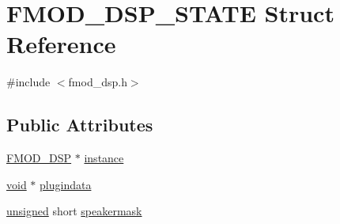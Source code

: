 \hypertarget{struct_f_m_o_d___d_s_p___s_t_a_t_e}{\section{F\-M\-O\-D\-\_\-\-D\-S\-P\-\_\-\-S\-T\-A\-T\-E Struct Reference}
\label{struct_f_m_o_d___d_s_p___s_t_a_t_e}
}


{\ttfamily \#include $<$fmod\-\_\-dsp.\-h$>$}

\subsection*{Public Attributes}
\begin{DoxyCompactItemize}
\item 
\hyperlink{fmod_8h_a2a546c1efce476d85cd8065d962d705d}{F\-M\-O\-D\-\_\-\-D\-S\-P} $\ast$ \hyperlink{struct_f_m_o_d___d_s_p___s_t_a_t_e_a1756ea7b18fdd566e64c64de4151a39c}{instance}
\item 
\hyperlink{wglew_8h_aeea6e3dfae3acf232096f57d2d57f084}{void} $\ast$ \hyperlink{struct_f_m_o_d___d_s_p___s_t_a_t_e_a94293193f1fd65ffc7d72de31e03932c}{plugindata}
\item 
\hyperlink{_free_image_8h_a425076c7067a1b5166e2cc530e914814}{unsigned} short \hyperlink{struct_f_m_o_d___d_s_p___s_t_a_t_e_a98c7cf116176d358e3d26193245f6e19}{speakermask}
\end{DoxyCompactItemize}


